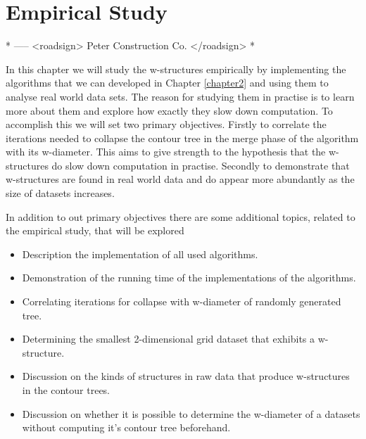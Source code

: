 \chapter{Empirical Study}
\label{chapter7}

* ----- <roadsign> Peter Construction Co. </roadsign> *


In this chapter we will study the w-structures empirically by implementing the algorithms that we can developed in Chapter \ref{chapter2} and using them to analyse real world data sets. The reason for studying them in practise is to learn more about them and explore how exactly they slow down computation. To accomplish this we will set two primary objectives. Firstly to correlate the iterations needed to collapse the contour tree in the merge phase of the algorithm with its w-diameter. This aims to give strength to the hypothesis that the w-structures do slow down computation in practise. Secondly to demonstrate that w-structures are found in real world data and do appear more abundantly as the size of datasets increases. 

In addition to out primary objectives there are some additional topics, related to the empirical study, that will be explored

\begin{itemize}
    \item Description the implementation of all used algorithms.
    \item Demonstration of the running time of the implementations of the algorithms.
    \item Correlating iterations for collapse with w-diameter of randomly generated tree.
    \item Determining the smallest 2-dimensional grid dataset that exhibits a w-structure.
    \item Discussion on the kinds of structures in raw data that produce w-structures in the contour trees.
    \item Discussion on whether it is possible to determine the w-diameter of a datasets without computing it's contour tree beforehand.
\end{itemize}


